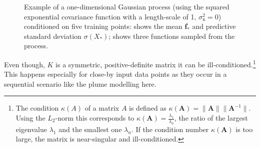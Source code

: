 \documentclass[11pt,a4paper,twoside,BCOR=15mm]{scrreprt}
\newcommand{\vc}[1]{\bm{#1}}
\newcommand{\mat}[1]{\bm{#1}}
\newcommand{\ped}[1]{_{\mathrm{#1}}}
\begin{document}
\begin{figure}
    \centering
    \caption[Gaussian process example]{Example of a one-dimensional Gaussian 
        process (using the squared exponential covariance function with 
        a length-scale of 1, $\sigma\ped{n}^2 = 0$) conditioned on five training 
        points:  shows the mean $\bar{\vc f_*}$ and predictive 
        standard deviation $\sigma(X_*)$;  shows three 
        functions sampled from the process.}\label{fig:ex-gp-main}
\end{figure}

Even though, $K$ is a symmetric, positive-definite matrix it can be 
ill-conditioned.\footnote{The condition $\kappa(A)$ of a matrix $A$ is defined 
    as $\kappa(\mat A) = \|\mat A\| \|\mat A^{-1}\|$. Using the $L_2$-norm this 
    corresponds to $\kappa(\mat A) = \frac{\lambda_1}{\lambda_n}$,
    the ratio of the largest eigenvalue $\lambda_1$ and the smallest one
    $\lambda_n$. If the condition number $\kappa(\mat A)$ is too large, the 
    matrix is near-singular and ill-conditioned.} This happens especially for 
close-by input data points as they occur in a sequential scenario like the plume 
modelling here.
\end{document}
